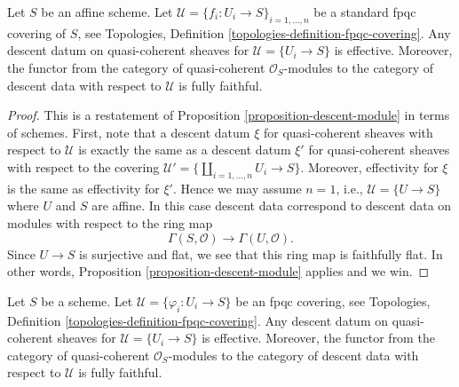 \begin{lemma}
\label{lemma-standard-fpqc-covering}
Let $S$ be an affine scheme.
Let $\mathcal{U} = \{f_i : U_i \to S\}_{i = 1, \ldots, n}$
be a standard fpqc covering of $S$, see
Topologies, Definition \ref{topologies-definition-fpqc-covering}.
Any descent datum on quasi-coherent sheaves
for $\mathcal{U} = \{U_i \to S\}$ is effective.
Moreover, the functor from the category of
quasi-coherent $\mathcal{O}_S$-modules to the category
of descent data with respect to $\mathcal{U}$ is fully faithful.
\end{lemma}

\begin{proof}
This is a restatement of Proposition \ref{proposition-descent-module}
in terms of schemes. First, note that a descent datum $\xi$
for quasi-coherent sheaves with respect to $\mathcal{U}$
is exactly the same as a descent datum $\xi'$ for quasi-coherent sheaves
with respect to the covering
$\mathcal{U}' = \{\coprod_{i = 1, \ldots, n} U_i \to S\}$.
Moreover, effectivity for $\xi$ is the same as effectivity for $\xi'$.
Hence we may assume $n = 1$, i.e., $\mathcal{U} = \{U \to S\}$
where $U$ and $S$ are affine. In this case descent data
correspond to descent data on modules with respect to the ring map
$$
\Gamma(S, \mathcal{O})
\longrightarrow
\Gamma(U, \mathcal{O}).
$$
Since $U \to S$ is surjective and flat, we see that this ring map
is faithfully flat. In other words,
Proposition \ref{proposition-descent-module} applies and we win.
\end{proof}

\begin{proposition}
\label{proposition-fpqc-descent-quasi-coherent}
Let $S$ be a scheme.
Let $\mathcal{U} = \{\varphi_i : U_i \to S\}$ be an fpqc covering, see
Topologies, Definition \ref{topologies-definition-fpqc-covering}.
Any descent datum on quasi-coherent sheaves
for $\mathcal{U} = \{U_i \to S\}$ is effective.
Moreover, the functor from the category of
quasi-coherent $\mathcal{O}_S$-modules to the category
of descent data with respect to $\mathcal{U}$ is fully faithful.
\end{proposition}

